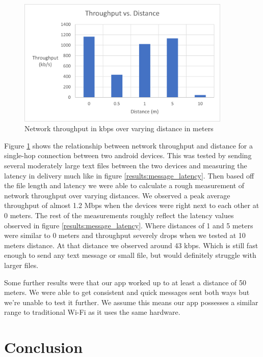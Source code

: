 \documentclass[10pt]{article}
\begin{document}
\begin{figure}[h!]
    \centering
    \includegraphics[width=4in]{throughput_graph.png}
    \caption{Network throughput in kbps over varying distance in meters}
    \label{results:throughput}
\end{figure}

Figure \ref{results:throughput} shows the relationship between network throughput and distance for a single-hop connection between two android devices. This was tested by sending several moderately large text files between the two devices and measuring the latency in delivery much like in figure \ref{results:message_latency}. Then based off the file length and latency we were able to calculate a rough measurement of network throughput over varying distances. We observed a peak average throughput of almost 1.2 Mbps when the devices were right next to each other at 0 meters. The rest of the measurements roughly reflect the latency values observed in figure \ref{results:message_latency}. Where distances of 1 and 5 meters were similar to 0 meters and throughput severely drops when we tested at 10 meters distance. At that distance we observed around 43 kbps. Which is still fast enough to send any text message or small file, but would definitely struggle with larger files.

Some further results were that our app worked up to at least a distance of 50 meters. We were able to get consistent and quick messages sent both ways but we're unable to test it further. We assume this means our app possesses a similar range to traditional Wi-Fi as it uses the same hardware.

\section{Conclusion}

\end{document}
